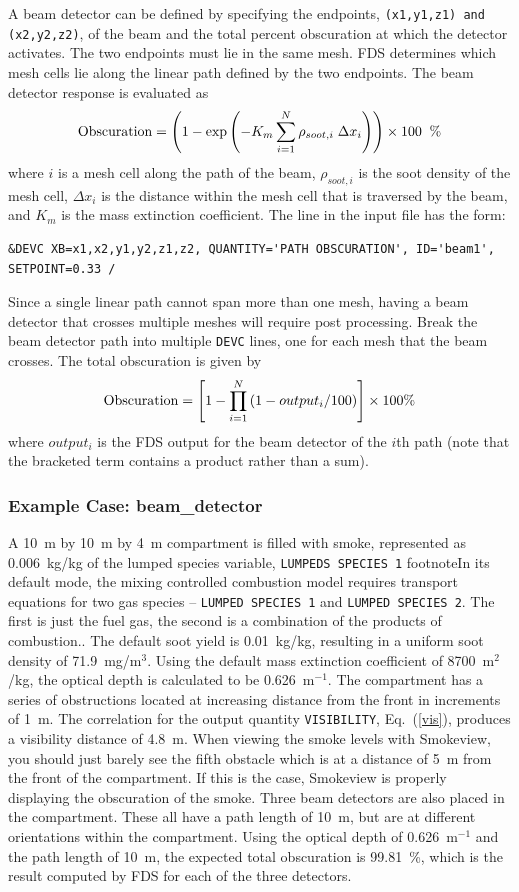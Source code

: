 \documentclass[11pt]{book}
\newcommand{\ct}{\tt\small}
\newcommand{\be}{\begin{equation}}
\newcommand{\ee}{\end{equation}}
\begin{document}
A beam detector can be defined by specifying the endpoints, {\ct (x1,y1,z1) and (x2,y2,z2)}, of the beam and the
total percent obscuration at which the detector activates.  The two endpoints must lie in the same mesh.  FDS determines which mesh
cells lie along the linear path defined by the two endpoints.  The beam detector response is evaluated as
\be
  \hbox{Obscuration}  = \left(1 - \exp \left( -K_m \sum_{i=1}^N {\rho_{soot,i}\; \Delta x_i} \right)  \right) \times 100  \; \; \hbox{\%}
\ee
where $i$ is a mesh cell along the path of the beam, $\rho_{soot,i}$ is the soot density of the mesh cell, $ \Delta x_i$
is the distance within the mesh cell that is traversed by the beam, and $K_m$ is the mass extinction coefficient. The line in the input file has the form:

\footnotesize
\begin{verbatim}
&DEVC XB=x1,x2,y1,y2,z1,z2, QUANTITY='PATH OBSCURATION', ID='beam1', SETPOINT=0.33 /
\end{verbatim}
\normalsize

\noindent
Since a single linear path cannot span more than one mesh, having a beam detector that crosses multiple meshes will require post processing.
Break the beam detector path into multiple {\ct DEVC} lines, one for each mesh that the beam crosses.  The total obscuration is given by
\be
  \hbox{Obscuration}  = \left[ 1 -  \prod_{i=1}^N \left( 1-output_i/100 \right)  \right] \times 100  \hbox{\%}
\ee
where $output_i$ is the FDS output for the beam detector of the $i$th path (note that the bracketed term contains a product rather than a sum).

\subsubsection{Example Case: {\bf beam\_detector}}

A 10~m by 10~m by 4~m compartment is filled with smoke, represented as 0.006~kg/kg of
the lumped species variable, {\ct LUMPEDS SPECIES 1} footnote{In its default mode, the mixing controlled combustion
model requires transport equations for two gas species -- {\ct LUMPED SPECIES 1} and {\ct LUMPED SPECIES 2}. The first
is just the fuel gas, the second is a combination of the products of combustion.}. The default soot yield is
0.01~kg/kg, resulting in a uniform soot density of 71.9~mg/m$^3$.
Using the default mass extinction coefficient of
8700~m$^2$/kg, the optical depth is calculated to be 0.626~m$^{-1}$.  The
compartment has a series of obstructions located at increasing distance from the front in increments of
1~m.  The correlation for the output quantity
{\ct VISIBILITY}, Eq.~(\ref{vis}), produces a visibility distance of 4.8~m.
When viewing the smoke levels with Smokeview, you should just barely see
the fifth obstacle which is at a distance of 5~m from the front of the compartment.
If this is the case, Smokeview is properly displaying the obscuration of the
smoke.  Three beam detectors are also
placed in the compartment.  These all have a path length of 10~m,
but are at different orientations within the compartment.
Using the optical depth of 0.626~m$^{-1}$ and the path length of
10~m, the expected total obscuration is 99.81~\%, which is the
result computed by FDS for each of the three detectors.
\end{document}
